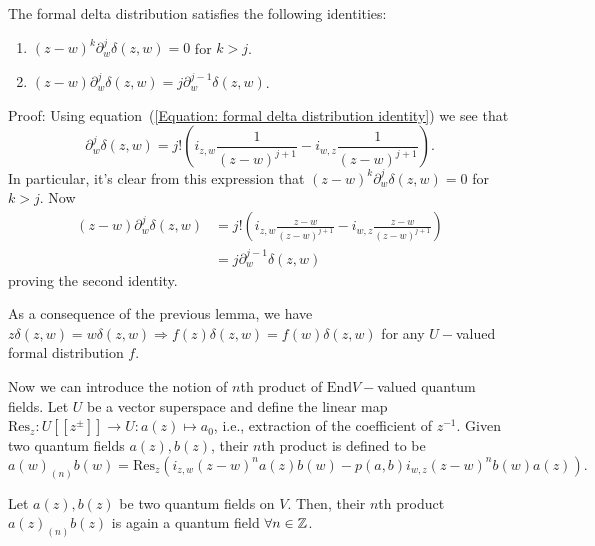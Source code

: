 \begin{dang}
    \begin{lemma}\label{Lemma: formal delta distribution identities}\cite{kac2013bombay}
        The formal delta distribution satisfies the following identities:
        \begin{enumerate}
            \item[(1)] $(z-w)^k\partial_w^j\delta(z,w)=0$ for $k>j$.
            \item[(2)] $(z-w)\partial_w^j\delta(z,w)=j\partial_w^{j-1}\delta(z,w)$.
        \end{enumerate}
    \end{lemma}
\end{dang}
Proof: Using equation~(\ref{Equation: formal delta distribution identity}) we see that
\begin{equation}
    \partial_w^j\delta(z,w)=j!\left(i_{z,w}\frac{1}{(z-w)^{j+1}}-i_{w,z}\frac{1}{(z-w)^{j+1}}\right).
\end{equation}
In particular, it's clear from this expression that $(z-w)^k\partial_w^j\delta(z,w)=0$ for $k>j$. Now
\begin{equation}
    \begin{split}
        (z-w) \partial_w^j\delta(z,w)&= j!\left(i_{z,w}\frac{z-w}{(z-w)^{j+1}}-i_{w,z}\frac{z-w}{(z-w)^{j+1}}\right)\\
        &=j \partial_w^{j-1}\delta(z,w)
    \end{split}
\end{equation}
proving the second identity.\par
As a consequence of the previous lemma, we have $z\delta(z,w)=w\delta(z,w)\Rightarrow f(z)\delta(z,w)=f(w)\delta(z,w)$ for any $U-$valued formal distribution $f$.\par
Now we can introduce the notion of $n$th product of $\text{End}V-$valued quantum fields. Let $U$ be a vector superspace and define the linear map $\text{Res}_z:U[[z^\pm]]\rightarrow U: a(z)\mapsto a_0$, i.e., extraction of the coefficient of $z^{-1}$. Given two quantum fields $a(z), b(z)$, their $n$th product is defined to be
\begin{equation}\label{Equation: nth product of quantum fields}
    a(w)_{(n)}b(w)=\text{Res}_z (i_{z,w}(z-w)^na(z)b(w)-p(a,b)i_{w,z}(z-w)^nb(w)a(z)).
\end{equation}
\begin{dang}
  \begin{lemma}\label{Lemma: the nth product of quamtum fields is a quantum field}\cite{de2006finite}
      Let $a(z), b(z)$ be two quantum fields on $V$. Then, their $n$th product $a(z)_{(n)}b(z)$ is again a quantum field $\forall n\in \mathbb{Z}$. 
  \end{lemma}
\end{dang}
